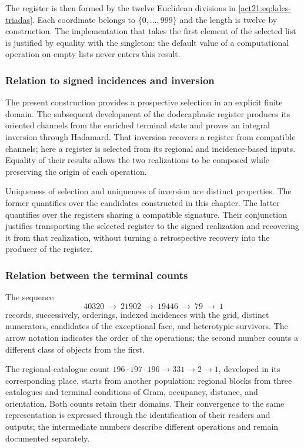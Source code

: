 The register is then formed by the twelve Euclidean divisions in
\eqref{act21:eq:kdes-triadas}. Each coordinate belongs to
$\{0,\ldots,999\}$ and the length is twelve by construction. The
implementation that takes the first element of the selected list
is justified by equality with the singleton: the default value
of a computational operation on empty lists never enters
this result.

\subsubsection{Relation to signed incidences and inversion}

The present construction provides a prospective selection in an
explicit finite domain. The subsequent development of the dodecaphasic
register produces its oriented channels from the enriched terminal
state and proves an integral inversion through
Hadamard. That inversion recovers a register from compatible
channels; here a register is selected from its
regional and incidence-based inputs. Equality of their results
allows the two realizations to be composed while preserving the origin of each
operation.

Uniqueness of selection and uniqueness of inversion are distinct
properties. The former quantifies over the candidates constructed in this
chapter. The latter quantifies over the registers sharing a compatible
signature. Their conjunction justifies transporting the selected register
to the signed realization and recovering it from that realization, without
turning a retrospective recovery into the producer of the register.

\subsubsection{Relation between the terminal counts}
\label{act21:sec:relacion-censos}

The sequence
\[
 40320\ \longrightarrow\ 21902\ \longrightarrow\ 19446
 \ \longrightarrow\ 79\ \longrightarrow\ 1
\]
records, successively, orderings, indexed incidences with the
grid, distinct numerators, candidates of the exceptional face, and
heterotypic survivors. The arrow notation indicates the order of
the operations; the second number counts a different class of objects
from the first.

The regional-catalogue count
$196\cdot197\cdot196\longrightarrow331\longrightarrow2
\longrightarrow1$, developed in its corresponding place, starts from
another population: regional blocks from three catalogues and terminal
conditions of Gram, occupancy, distance, and orientation. Both counts
retain their domains. Their convergence to the same representation is
expressed through the identification of their readers and outputs;
the intermediate numbers describe different operations and remain
documented separately.

